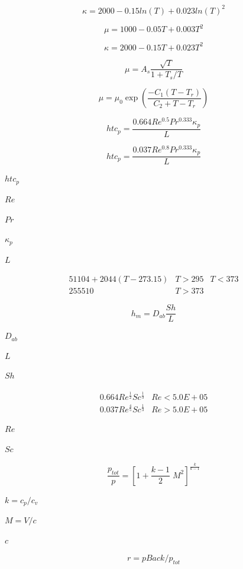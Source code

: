 \documentclass{article}
\begin{document}
\[
            \kappa = 2000 - 0.15 ln(T) + 0.023 ln(T)^2
        \]
\pagebreak

\[
            \mu    = 1000 - 0.05 T + 0.003 T^2
        \]
\pagebreak

\[
            \kappa = 2000 - 0.15 T + 0.023 T^2
        \]
\pagebreak

\[
    \mu = A_s \frac{\sqrt{T}}{1 + T_s / T}
\]
\pagebreak

\[
    \mu = \mu_0 \exp \left(\frac{-C_1 ( T - T_r )}{C_2 + T - T_r}\right)
\]
\pagebreak

\[
    htc_p = \frac{0.664 Re^{0.5} Pr^{0.333} \kappa_p}{L}
\]
\pagebreak

\[
    htc_p = \frac{0.037 Re^{0.8} Pr^{0.333} \kappa_p}{L}
\]
\pagebreak

$        htc_p   $
\pagebreak

$        Re      $
\pagebreak

$        Pr      $
\pagebreak

$        \kappa_p $
\pagebreak

$        L       $
\pagebreak

\begin{eqnarray*}
    51104 + 2044 (T - 273.15)   & T > 295 & T < 373 \\
    255510                      & T > 373 &
\end{eqnarray*}
\pagebreak

\[ h_m = D_{ab} \frac{Sh}{L} \]
\pagebreak

$        D_{ab} $
\pagebreak

$        L      $
\pagebreak

$        Sh     $
\pagebreak

\begin{eqnarray*}
            0.664 Re^\frac{1}{2} Sc^\frac{1}{3} & Re < 5.0E+05 \\
            0.037 Re^\frac{4}{5} Sc^\frac{1}{3} & Re > 5.0E+05
    \end{eqnarray*}
\pagebreak

$        Re     $
\pagebreak

$        Sc     $
\pagebreak

\[
    \frac{p_{tot}}{p}=\left[ 1+ \frac{k-1}{2}\;M^2 \right]^{\frac{k}{k-1}}
\]
\pagebreak

$k=c_p/c_v$
\pagebreak

$M=V/c$
\pagebreak

$c$
\pagebreak

\[
    r =  pBack/p_{tot}
\]
\pagebreak
\end{document}
